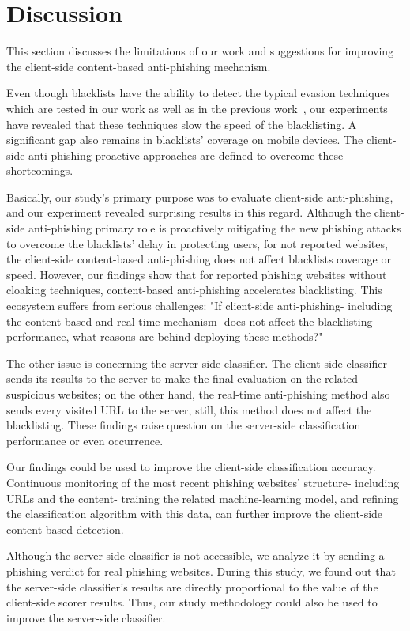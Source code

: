 \section{Discussion}
\label{s:discussion}

This section discusses the limitations of our work and suggestions for improving the client-side content-based anti-phishing mechanism.

Even though blacklists have the ability to detect the typical evasion techniques which are tested in our work as well as in the previous work~\cite{oest2020phishtime}, our experiments have revealed that these techniques slow the speed of the blacklisting. A significant gap also remains in blacklists' coverage on mobile devices. The client-side anti-phishing proactive approaches are defined to overcome these shortcomings.

Basically, our study's primary purpose was to evaluate client-side anti-phishing, and our experiment revealed surprising results in this regard. Although the client-side anti-phishing primary role is proactively mitigating the new phishing attacks to overcome the blacklists' delay in protecting users, for not reported websites, the client-side content-based anti-phishing does not affect blacklists coverage or speed. However, our findings show that for reported phishing websites without cloaking techniques, content-based anti-phishing accelerates blacklisting. This ecosystem suffers from serious challenges: "If client-side anti-phishing- including the content-based and real-time mechanism- does not affect the blacklisting performance, what reasons are behind deploying these methods?"

The other issue is concerning the server-side classifier. The client-side classifier sends its results to the server to make the final evaluation on the related suspicious websites; on the other hand, the real-time anti-phishing method also sends every visited URL to the server, still, this method does not affect the blacklisting. These findings raise question on the server-side classification performance or even occurrence.

Our findings could be used to improve the client-side classification accuracy. Continuous monitoring of the most recent phishing websites' structure- including URLs and the content- training the related machine-learning model, and refining the classification algorithm with this data, can further improve the client-side content-based detection.

Although the server-side classifier is not accessible, we analyze it by sending a phishing verdict for real phishing websites. During this study, we found out that the server-side classifier's results are directly proportional to the value of the client-side scorer results. Thus, our study methodology could also be used to improve the server-side classifier.

